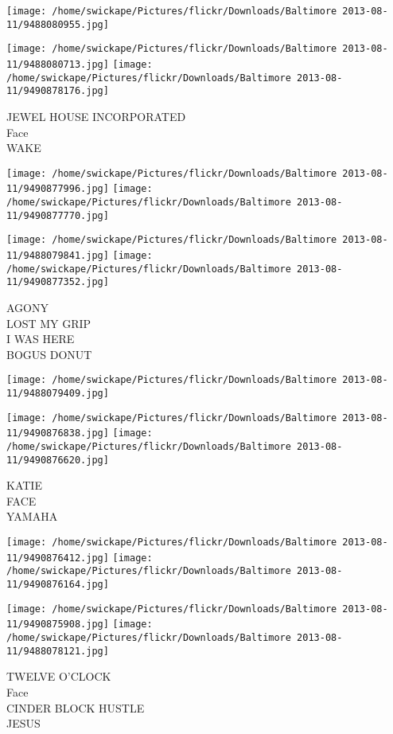 \documentclass[10pt,letterpaper]{article}
\begin{document}
\texttt{[image: /home/swickape/Pictures/flickr/Downloads/Baltimore 2013-08-11/9488080955.jpg]}

\vspace{0.25in}
\texttt{[image: /home/swickape/Pictures/flickr/Downloads/Baltimore 2013-08-11/9488080713.jpg]}
\texttt{[image: /home/swickape/Pictures/flickr/Downloads/Baltimore 2013-08-11/9490878176.jpg]}

JEWEL HOUSE INCORPORATED\\
Face\\
WAKE
\pagebreak

\texttt{[image: /home/swickape/Pictures/flickr/Downloads/Baltimore 2013-08-11/9490877996.jpg]}
\texttt{[image: /home/swickape/Pictures/flickr/Downloads/Baltimore 2013-08-11/9490877770.jpg]}

\texttt{[image: /home/swickape/Pictures/flickr/Downloads/Baltimore 2013-08-11/9488079841.jpg]}
\texttt{[image: /home/swickape/Pictures/flickr/Downloads/Baltimore 2013-08-11/9490877352.jpg]}

AGONY\\
LOST MY GRIP\\
I WAS HERE\\
BOGUS DONUT
\pagebreak

\texttt{[image: /home/swickape/Pictures/flickr/Downloads/Baltimore 2013-08-11/9488079409.jpg]}

\vspace{0.25in}
\texttt{[image: /home/swickape/Pictures/flickr/Downloads/Baltimore 2013-08-11/9490876838.jpg]}
\texttt{[image: /home/swickape/Pictures/flickr/Downloads/Baltimore 2013-08-11/9490876620.jpg]}

KATIE\\
FACE\\
YAMAHA
\pagebreak

\texttt{[image: /home/swickape/Pictures/flickr/Downloads/Baltimore 2013-08-11/9490876412.jpg]}
\texttt{[image: /home/swickape/Pictures/flickr/Downloads/Baltimore 2013-08-11/9490876164.jpg]}

\texttt{[image: /home/swickape/Pictures/flickr/Downloads/Baltimore 2013-08-11/9490875908.jpg]}
\texttt{[image: /home/swickape/Pictures/flickr/Downloads/Baltimore 2013-08-11/9488078121.jpg]}

TWELVE O'CLOCK\\
Face\\
CINDER BLOCK HUSTLE\\
JESUS
\pagebreak
\end{document}
